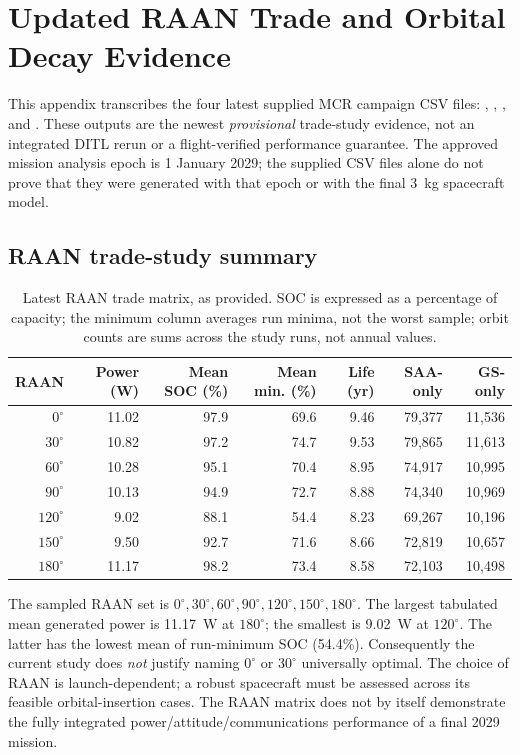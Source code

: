 \section{Updated RAAN Trade and Orbital Decay Evidence}\label{app:updated-raan}
This appendix transcribes the four latest supplied MCR campaign CSV files: , , , and . These outputs are the newest \emph{provisional} trade-study evidence, not an integrated DITL rerun or a flight-verified performance guarantee. The approved mission analysis epoch is 1 January 2029; the supplied CSV files alone do not prove that they were generated with that epoch or with the final 3~kg spacecraft model.

\subsection{RAAN trade-study summary}
\begin{table}[htbp]\centering\footnotesize
\caption{Latest RAAN trade matrix, as provided. SOC is expressed as a percentage of capacity; the minimum column averages run minima, not the worst sample; orbit counts are sums across the study runs, not annual values.}\label{tab:raan-updated}
\begin{tabular}{@{}rrrrrrr@{}}\toprule
RAAN & Power (W) & Mean SOC (\%) & Mean min. (\%) & Life (yr) & SAA-only & GS-only\\\midrule
$0^\circ$ & 11.02 & 97.9 & 69.6 & 9.46 & 79,377 & 11,536 \\
$30^\circ$ & 10.82 & 97.2 & 74.7 & 9.53 & 79,865 & 11,613 \\
$60^\circ$ & 10.28 & 95.1 & 70.4 & 8.95 & 74,917 & 10,995 \\
$90^\circ$ & 10.13 & 94.9 & 72.7 & 8.88 & 74,340 & 10,969 \\
$120^\circ$ & 9.02 & 88.1 & 54.4 & 8.23 & 69,267 & 10,196 \\
$150^\circ$ & 9.50 & 92.7 & 71.6 & 8.66 & 72,819 & 10,657 \\
$180^\circ$ & 11.17 & 98.2 & 73.4 & 8.58 & 72,103 & 10,498 \\
\bottomrule\end{tabular}\end{table}
The sampled RAAN set is $0^\circ,30^\circ,60^\circ,90^\circ,120^\circ,150^\circ,180^\circ$. The largest tabulated mean generated power is 11.17~W at $180^\circ$; the smallest is 9.02~W at $120^\circ$. The latter has the lowest mean of run-minimum SOC (54.4\%). Consequently the current study does \emph{not} justify naming $0^\circ$ or $30^\circ$ universally optimal. The choice of RAAN is launch-dependent; a robust spacecraft must be assessed across its feasible orbital-insertion cases. The RAAN matrix does not by itself demonstrate the fully integrated power/attitude/communications performance of a final 2029 mission.

